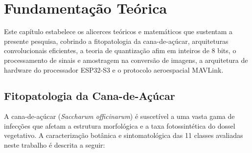 \chapter{Fundamentação Teórica}
\label{cap:fundamentacao}

Este capítulo estabelece os alicerces teóricos e matemáticos que sustentam a presente pesquisa, cobrindo a fitopatologia da cana-de-açúcar, arquiteturas convolucionais eficientes, a teoria de quantização afim em inteiros de 8 bits, o processamento de sinais e amostragem na conversão de imagens, a arquitetura de hardware do processador ESP32-S3 e o protocolo aeroespacial MAVLink.

\section{Fitopatologia da Cana-de-Açúcar}

A cana-de-açúcar (\textit{Saccharum officinarum}) é suscetível a uma vasta gama de infecções que afetam a estrutura morfológica e a taxa fotossintética do dossel vegetativo. A caracterização botânica e sintomatológica das 11 classes avaliadas neste trabalho é descrita a seguir:

